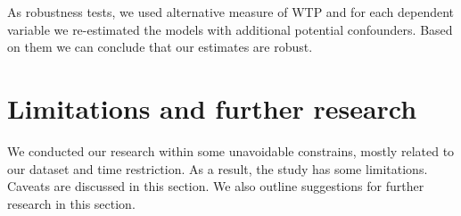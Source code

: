 \documentclass[a4paper,12pt]{article}
\begin{document}
As robustness tests, we used alternative measure of WTP and for each dependent variable we re-estimated the models with additional potential confounders. Based on them we can conclude that our estimates are robust.







\section{Limitations and further research}\label{Caveats}


We conducted our research within some unavoidable constrains, mostly related to our dataset and time restriction. As a result, the study has some limitations. Caveats are discussed in this section. We also outline suggestions for further research in this section.
\end{document}
